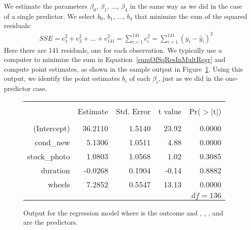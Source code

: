 We estimate the parameters $\beta_0$, $\beta_1$, ..., $\beta_4$ in the same way as we did in the case of a single predictor. We select $b_0$, $b_1$, ..., $b_4$ that minimize the sum of the squared residuals:
\begin{align}\label{sumOfSqResInMultRegr}
SSE = e_1^2 + e_2^2 + \dots + e_{141}^2
	= \sum_{i=1}^{141} e_i^2
	 = \sum_{i=1}^{141} \left(y_i - \hat{y}_i\right)^2
\end{align}
Here there are 141 residuals, one for each observation. We typically use a computer to minimize the sum in Equation~\eqref{sumOfSqResInMultRegr} and compute point estimates, as shown in the sample output in Figure~\ref{outputForMultipleRegrOutputForAllPredictors}. Using this output, we identify the point estimates $b_i$ of each $\beta_i$, just as we did in the one-predictor case.

\begin{figure}[ht]
\centering
\begin{tabular}{rrrrr}
  \hline
  \vspace{-3.7mm} & & & & \\
 & Estimate & Std. Error & t value & Pr($>$$|$t$|$) \\ 
  \hline
  \vspace{-3.8mm} & & & & \\
(Intercept) & 36.2110 & 1.5140 & 23.92 & 0.0000 \\ 
  cond\_\hspace{0.3mm}new & 5.1306 & 1.0511 & 4.88 & 0.0000 \\ 
  stock\_\hspace{0.3mm}photo & 1.0803 & 1.0568 & 1.02 & 0.3085 \\ 
  duration & -0.0268 & 0.1904 & -0.14 & 0.8882 \\ 
  wheels & 7.2852 & 0.5547 & 13.13 & 0.0000 \\ 
   \hline
   &&&\multicolumn{2}{r}{$df=136$}
\end{tabular}
\caption{Output for the regression model where  is the outcome and , , , and  are the predictors.}
\label{outputForMultipleRegrOutputForAllPredictors}
\end{figure}

